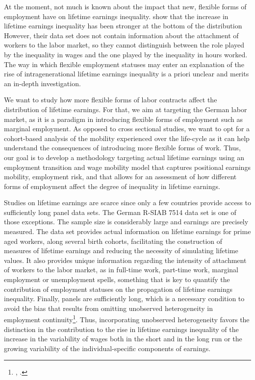 \documentclass[12pt, a4paper]{article}
\begin{document}
At the moment, not much is known about the impact that new, flexible forms of employment have on lifetime earnings inequality. \cite{BoCo15} show that the increase in lifetime earnings inequality has been stronger at the bottom of the distribution However, their data set does not contain information about the attachment of workers to the labor market, so they cannot distinguish between the role played by the inequality in wages and the one played by the inequality in hours worked. The way in which flexible employment statuses may enter an explanation of the rise of intragenerational lifetime earnings inequality is a priori unclear and merits an in-depth investigation.



We want to study how more flexible forms of labor contracts affect the distribution of lifetime earnings. For that, we aim at targeting the German labor market, as it is a paradigm in introducing flexible forms of employment such as marginal employment. As opposed to cross sectional studies, we want to opt for a cohort-based analysis of the mobility experienced over the life-cycle as it can help understand the consequences of introducing more flexible forms of work. Thus, our goal is to develop a methodology targeting actual lifetime earnings using an employment transition and wage mobility model that captures positional earnings mobility, employment risk, and that allows for an assessment of how different forms of employment affect the degree of inequality in lifetime earnings.


Studies on lifetime earnings are scarce since only a few countries provide access to sufficiently long panel data sets. The German R-SIAB 7514 data set is one of those exceptions. The sample size is considerably large and earnings are precisely measured. The data set provides actual information on lifetime earnings for prime aged workers, along several birth cohorts, facilitating the construction of measures of lifetime earnings and reducing the necessity of simulating lifetime values. It also provides unique information regarding the intensity of attachment of workers to the labor market, as in full-time work, part-time work, marginal employment or unemployment spells, something that is key to quantify the contribution of employment statuses on the propagation of lifetime earnings inequality. Finally, panels are sufficiently long, which is a necessary condition to avoid the bias that results from omitting unobserved heterogeneity in employment continuity\footnote{\cite{AddiSur08}, \cite{BowRo10}.}. Thus, incorporating unobserved heterogeneity favors the distinction in the contribution to the rise in lifetime earnings inequality of the increase in the variability of wages both in the short and in the long run or the growing variability of the individual-specific components of earnings.
\end{document}
